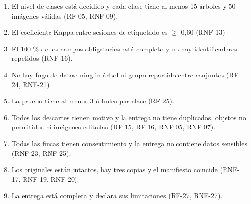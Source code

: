 \documentclass[11pt]{article}
\begin{document}
\begin{enumerate}[leftmargin=1.2em,itemsep=2pt,topsep=2pt]
\item El nivel de clases está decidido y cada clase tiene al menos 15 árboles y 50 imágenes válidas (RF-05, RNF-09).
\item El coeficiente Kappa entre sesiones de etiquetado es $\geq$ 0,60 (RNF-13).
\item El 100 \% de los campos obligatorios está completo y no hay identificadores repetidos (RNF-16).
\item No hay fuga de datos: ningún árbol ni grupo repartido entre conjuntos (RF-24, RNF-21).
\item La prueba tiene al menos 3 árboles por clase (RF-25).
\item Todos los descartes tienen motivo y la entrega no tiene duplicados, objetos no permitidos ni imágenes editadas (RF-15, RF-16, RNF-05, RNF-07).
\item Todas las fincas tienen consentimiento y la entrega no contiene datos sensibles (RNF-23, RNF-25).
\item Los originales están intactos, hay tres copias y el manifiesto coincide (RNF-17, RNF-19, RNF-20).
\item La entrega está completa y declara sus limitaciones (RF-27, RNF-27).
\end{enumerate}
\end{document}
